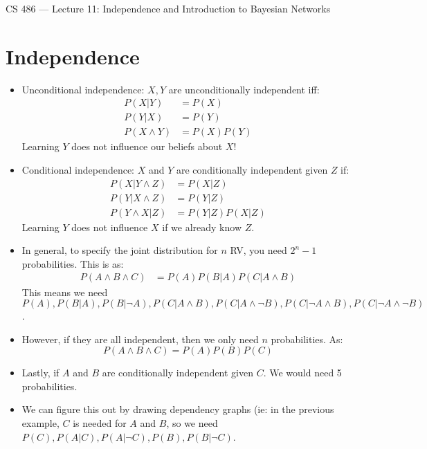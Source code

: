 \documentclass{article}
\author{Clement Tsang}
\begin{document}
\begin{center}
    \Large{CS 486 --- Lecture 11: Independence and Introduction to Bayesian Networks}
\end{center}

\section{Independence}
\begin{itemize}
    \item Unconditional independence: $X, Y$ are unconditionally independent iff:
        \begin{align*}
            P(X|Y) &= P(X) \\
            P(Y|X) &= P(Y) \\
            P(X \wedge Y) &= P(X)P(Y)
        \end{align*}
        Learning $Y$ does not influence our beliefs about $X$!
    \item Conditional independence: $X$ and $Y$ are conditionally independent given $Z$ if:
        \begin{align*}
            P(X|Y \wedge Z) &= P(X|Z) \\
            P(Y|X \wedge Z) &= P(Y|Z) \\
            P(Y \wedge X | Z) &= P(Y | Z) P(X | Z)
        \end{align*}
        Learning $Y$ does not influence $X$ if we already know $Z$.
    \item In general, to specify the joint distribution for $n$ RV, you need $2^n - 1$ probabilities.  This is as:
        \begin{align*}
            P(A \wedge B \wedge C) &= P(A) P(B|A) P(C|A \wedge B)
        \end{align*}
        This means we need $P(A), P(B|A), P(B|\neg A), P(C | A \wedge B), P(C | A \wedge \neg B), P(C | \neg A \wedge B), P(C | \neg A \wedge \neg B)$.
    \item However, if they are all independent, then we only need $n$ probabilities.  As:
        \[
            P(A \wedge B \wedge C) = P(A) P(B) P(C)
        \]
    \item Lastly, if $A$ and $B$ are conditionally independent given $C$.  We would need 5 probabilities.
    \item We can figure this out by drawing dependency graphs (ie: in the previous example, $C$ is needed for $A$ and $B$, so we need $P(C), P(A|C), P(A|\neg C), P(B), P(B|\neg C)$.
\end{itemize}
\end{document}
